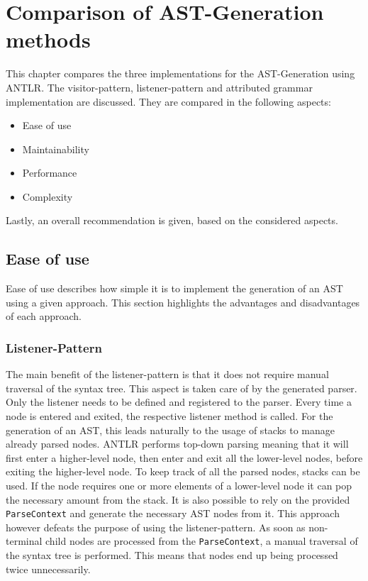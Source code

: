 \chapter{Comparison of AST-Generation methods}

This chapter compares the three implementations for the AST-Generation using ANTLR. The visitor-pattern, listener-pattern and attributed grammar implementation are discussed. They are compared in the following aspects:

\begin{itemize}
    \item Ease of use
    \item Maintainability
    \item Performance
    \item Complexity
\end{itemize}

Lastly, an overall recommendation is given, based on the considered aspects. 

\section{Ease of use}

Ease of use describes how simple it is to implement the generation of an AST using a given approach. This section highlights the advantages and disadvantages of each approach.  

\subsection{Listener-Pattern}

The main benefit of the listener-pattern is that it does not require manual traversal of the syntax tree. This aspect is taken care of by the generated parser. Only the listener needs to be defined and registered to the parser. Every time a node is entered and exited, the respective listener method is called. For the generation of an AST, this leads naturally to the usage of stacks to manage already parsed nodes. ANTLR performs top-down parsing meaning that it will first enter a higher-level node, then enter and exit all the lower-level nodes, before exiting the higher-level node. To keep track of all the parsed nodes, stacks can be used. If the node requires one or more elements of a lower-level node it can pop the necessary amount from the stack. It is also possible to rely on the provided \verb|ParseContext| and generate the necessary AST nodes from it. This approach however defeats the purpose of using the listener-pattern. As soon as non-terminal child nodes are processed from the \verb|ParseContext|, a manual traversal of the syntax tree is performed. This means that nodes end up being processed twice unnecessarily. 

